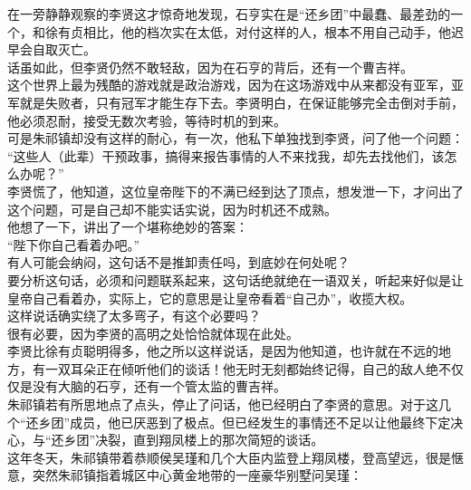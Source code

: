 \begin{multicols}{\theparacolNo}
在一旁静静观察的李贤这才惊奇地发现，石亨实在是“还乡团”中最蠢、最差劲的一个，和徐有贞相比，他的档次实在太低，对付这样的人，根本不用自己动手，他迟早会自取灭亡。\\

话虽如此，但李贤仍然不敢轻敌，因为在石亨的背后，还有一个曹吉祥。\\

这个世界上最为残酷的游戏就是政治游戏，因为在这场游戏中从来都没有亚军，亚军就是失败者，只有冠军才能生存下去。李贤明白，在保证能够完全击倒对手前，他必须忍耐，接受无数次考验，等待时机的到来。\\

可是朱祁镇却没有这样的耐心，有一次，他私下单独找到李贤，问了他一个问题：\\

“这些人（此辈）干预政事，搞得来报告事情的人不来找我，却先去找他们，该怎么办呢？”\\

李贤慌了，他知道，这位皇帝陛下的不满已经到达了顶点，想发泄一下，才问出了这个问题，可是自己却不能实话实说，因为时机还不成熟。\\

他想了一下，讲出了一个堪称绝妙的答案：\\

“陛下你自己看着办吧。”\\

有人可能会纳闷，这句话不是推卸责任吗，到底妙在何处呢？\\

要分析这句话，必须和问题联系起来，这句话绝就绝在一语双关，听起来好似是让皇帝自己看着办，实际上，它的意思是让皇帝看着“自己办”，收揽大权。\\

这样说话确实绕了太多弯子，有这个必要吗？\\

很有必要，因为李贤的高明之处恰恰就体现在此处。\\

李贤比徐有贞聪明得多，他之所以这样说话，是因为他知道，也许就在不远的地方，有一双耳朵正在倾听他们的谈话！他无时无刻都始终记得，自己的敌人绝不仅仅是没有大脑的石亨，还有一个管太监的曹吉祥。\\

朱祁镇若有所思地点了点头，停止了问话，他已经明白了李贤的意思。对于这几个“还乡团”成员，他已厌恶到了极点。但已经发生的事情还不足以让他最终下定决心，与“还乡团”决裂，直到翔凤楼上的那次简短的谈话。\\

这年冬天，朱祁镇带着恭顺侯吴瑾和几个大臣内监登上翔凤楼，登高望远，很是惬意，突然朱祁镇指着城区中心黄金地带的一座豪华别墅问吴瑾：\\


\end{multicols}
